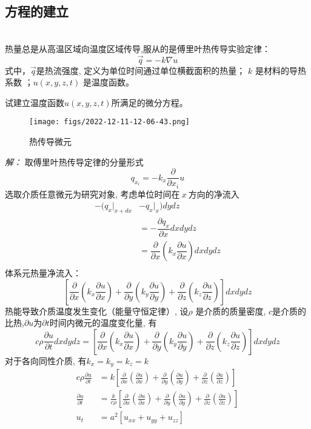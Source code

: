 \subsection{方程的建立} ~\\
热量总是从高温区域向温度区域传导,服从的是傅里叶热传导实验定律：
\begin{equation*}
	\vec{q}=-k\nabla u
\end{equation*}
式中，$\vec{q}$是热流强度, 定义为单位时间通过单位横截面积的热量； $k$ 是材料的导热系数 ；$u(x,y,z,t)$ 是温度函数。\\
\begin{example}
 试建立温度函数$u(x,y,z,t)$所满足的微分方程。
\end{example} 
\begin{figure}[h]
	\centering
	\texttt{[image: figs/2022-12-11-12-06-43.png]}
	\caption{热传导微元}
\end{figure}
\emph{解：}
	取傅里叶热传导定律的分量形式 \\
	$$q_{x_i}=-k_x \dfrac{\partial }{\partial x_{i}} u$$ 
选取介质任意微元为研究对象, 考虑单位时间在$~x~$方向的净流入\\
\[\begin{aligned}
	-(q_x|_{x+dx} &-q_x|_x)dydz \\
	&=-\dfrac{\partial q_x }{\partial x}  dxdydz\\
	&= \dfrac{\partial }{\partial x} (k_x \dfrac{\partial u}{\partial x})dxdydz \\
\end{aligned}\]
体系元热量净流入：$$
	\left[\frac{\partial }{\partial x} (k_x\frac{\partial u}{\partial x}) + \frac{\partial }{\partial y} (k_y\frac{\partial u}{\partial y}) + \frac{\partial }{\partial z} (k_z\frac{\partial u}{\partial z}) \right]dxdydz 
$$ 
热能导致介质温度发生变化（能量守恒定律）, 设$\rho$ 是介质的质量密度, $c$是介质的比热,$\partial u$为$\partial t$时间内微元的温度变化量, 有\\
	\begin{equation*}
		c \rho \frac{\partial u}{\partial t}dxdydz=\left[\frac{\partial }{\partial x} (k_x\frac{\partial u}{\partial x}) + \frac{\partial }{\partial y} (k_y\frac{\partial u}{\partial y}) + \frac{\partial }{\partial z} (k_z\frac{\partial u}{\partial z}) \right]dxdydz 
	\end{equation*}
对于各向同性介质, 有$ k_x =k_y=k_z =k  $ 
\begin{equation*}
	\begin{aligned}
	c \rho \frac{\partial u }{\partial t}&=k\left[\frac{\partial }{\partial x} (\frac{\partial u}{\partial x}) + \frac{\partial }{\partial y} (\frac{\partial u}{\partial y}) + \frac{\partial }{\partial z} (\frac{\partial u}{\partial z}) \right]	 \\
\frac{\partial u }{\partial t}&=\frac{k}{c\rho}\left[\frac{\partial }{\partial x} (\frac{\partial u}{\partial x}) + \frac{\partial }{\partial y} (\frac{\partial u}{\partial y}) + \frac{\partial }{\partial z} (\frac{\partial u}{\partial z}) \right] \\
u_t&=a^2 [u_{xx}   +u_{yy}  +u_{zz}] 
\end{aligned}
\end{equation*}

